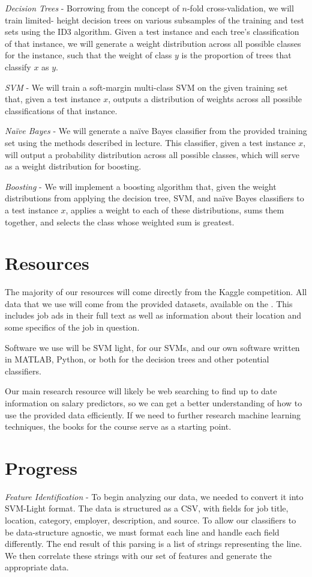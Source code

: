 \documentclass{pset}
\begin{document}
{\it Decision Trees} - Borrowing from the concept of $n$-fold cross-validation,
we will train limited- height decision trees on various subsamples of the
training and test sets using the ID3 algorithm. Given a test instance and each
tree's classification of that instance, we will generate a weight distribution
across all possible classes for the instance, such that the weight of class $y$
is the proportion of trees that classify $x$ as $y$.

{\it SVM} - We will train a soft-margin multi-class SVM on the given training
set that, given a test instance $x$, outputs a distribution of weights across
all possible classifications of that instance.

{\it Naïve Bayes} - We will generate a naïve Bayes classifier from the provided
training set using the methods described in lecture. This classifier, given a
test instance $x$, will output a probability distribution across all possible
classes, which will serve as a weight distribution for boosting.

{\it Boosting} - We will implement a boosting algorithm that, given the weight
distributions from applying the decision tree, SVM, and naïve Bayes classifiers
to a test instance $x$, applies a weight to each of these distributions, sums
them together, and selects the class whose weighted sum is greatest.

\section*{Resources}

The majority of our resources will come directly from the Kaggle competition.
All data that we use will come from the provided datasets, available on the
.
This includes job ads in their full text as well as information about their
location and some specifics of the job in question.

Software we use will be SVM light, for our SVMs, and our own software written in
MATLAB, Python, or both for the decision trees and other potential classifiers.

Our main research resource will likely be web searching to find up to date
information on salary predictors, so we can get a better understanding of how to
use the provided data efficiently. If we need to further research machine
learning techniques, the books for the course serve as a starting point.

\section*{Progress}
{\it Feature Identification} - To begin analyzing our data, we needed to convert
it into SVM-Light format. The data is structured as a CSV, with fields for job
title, location, category, employer, description, and source. To allow our
classifiers to be data-structure agnostic, we must format each line and handle
each field differently. The end result of this parsing is a list of strings
representing the line. We then correlate these strings with our set of features
and generate the appropriate data.
\end{document}

